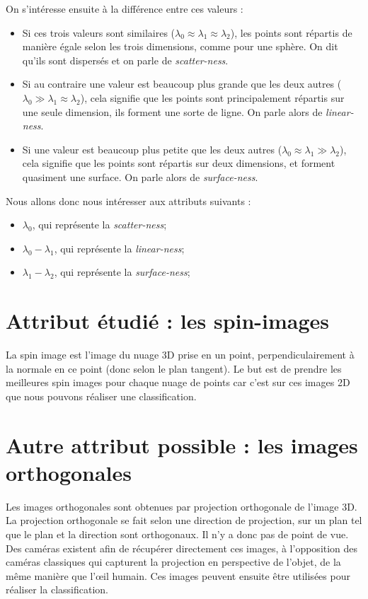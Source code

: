 		On s’intéresse ensuite à la différence entre ces valeurs :
		\begin{itemize}
			\item Si ces trois valeurs sont similaires ($\lambda_0 \approx \lambda_1 \approx \lambda_2$), les points sont répartis de manière égale selon les trois dimensions, comme pour une sphère. On dit qu'ils sont dispersés et on parle de \emph{scatter-ness}.
			\item Si au contraire une valeur est beaucoup plus grande que les deux autres ($\lambda_0 \gg \lambda_1 \approx \lambda_2$), cela signifie que les points sont principalement répartis sur une seule dimension, ils forment une sorte de ligne. On parle alors de \emph{linear-ness}.
			\item Si une valeur est beaucoup plus petite que les deux autres ($\lambda_0 \approx \lambda_1 \gg \lambda_2$), cela signifie que les points sont répartis sur deux dimensions, et forment quasiment une surface. On parle alors de \emph{surface-ness}.\\
		\end{itemize}

		Nous allons donc nous intéresser aux attributs suivants :
		\begin{itemize}
			\item $\lambda_0$, qui représente la \emph{scatter-ness};
			\item $\lambda_0 - \lambda_1$, qui représente la \emph{linear-ness};
			\item $\lambda_1 - \lambda_2$, qui représente la \emph{surface-ness};
		\end{itemize}

\section{Attribut étudié : les spin-images}

	La spin image est l’image du nuage 3D prise en un point, perpendiculairement à la normale en ce point (donc selon le plan tangent). Le but est de prendre les meilleures spin images pour chaque nuage de points car c’est sur ces images 2D que nous pouvons réaliser une classification.


\section{Autre attribut possible : les images orthogonales}

	Les images orthogonales sont obtenues par projection orthogonale de l'image 3D. La projection orthogonale se fait selon une direction de projection, sur un plan tel que le plan et la direction sont orthogonaux. Il n'y a donc pas de point de vue. Des caméras existent afin de récupérer directement ces images, à l’opposition des caméras classiques qui capturent la projection en perspective de l'objet, de la même manière que l’œil humain. Ces images peuvent ensuite être utilisées pour réaliser la classification.

